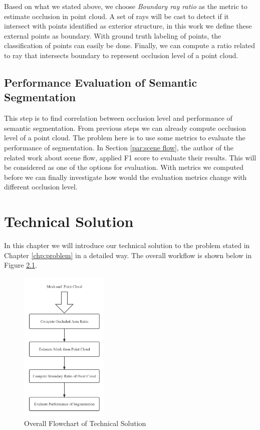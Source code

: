 \documentclass[11pt, a4paper,oneside,chapterprefix=false]{scrbook}
\begin{document}
Based on what we stated above, we choose \emph{Boundary ray ratio} as the metric to estimate occlusion in point cloud. A set of rays will be cast to detect if it intersect with points identified as exterior structure, in this work we define these external points as boundary. With ground truth labeling of points, the classification of points can easily be done. Finally, we can compute a ratio related to ray that intersects boundary to represent occlusion level of a point cloud. 

\section{Performance Evaluation of Semantic Segmentation} \label{sec:performance evaluation}

This step is to find correlation between occlusion level and performance of semantic segmentation. From previous steps we can already compute occlusion level of a point cloud. The problem here is to use some metrics to evaluate the performance of segmentation. In Section \ref{par:scene flow}, the author of the related work about scene flow, applied F1 score to evaluate their results. This will be considered as one of the options for evaluation. With metrics we computed before we can finally investigate how would the evaluation metrics change with different occlusion level. 

\chapter{Technical Solution} \label{chp:solution}

In this chapter we will introduce our technical solution to the problem stated in Chapter \ref{chp:problem} in a detailed way. The overall workflow is shown below in Figure \ref{fig:overall flowchart of technical solution}.

\begin{figure}[H]
    \centering
    \includegraphics*[width=0.38\textwidth]{figures/technical solution flowchart.png}
    \caption{Overall Flowchart of Technical Solution}
    \label{fig:overall flowchart of technical solution}
\end{figure}
\end{document}
